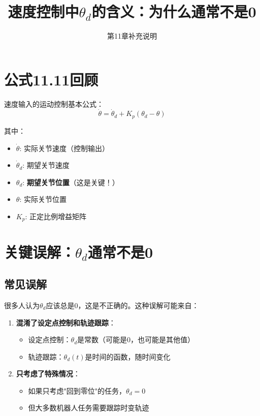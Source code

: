 \documentclass[12pt,a4paper]{article}
\title{速度控制中$\theta_d$的含义：为什么通常不是0}
\author{第11章补充说明}
\date{}
\begin{document}
\maketitle

\section{公式11.11回顾}

速度输入的运动控制基本公式：
\begin{equation}
\dot{\theta} = \dot{\theta}_d + K_p(\theta_d - \theta) \tag{11.11}
\end{equation}

其中：
\begin{itemize}
\item $\dot{\theta}$: 实际关节速度（控制输出）
\item $\dot{\theta}_d$: 期望关节速度
\item $\theta_d$: \textbf{期望关节位置}（这是关键！）
\item $\theta$: 实际关节位置
\item $K_p$: 正定比例增益矩阵
\end{itemize}

\section{关键误解：$\theta_d$通常不是0}

\subsection{常见误解}

很多人认为$\theta_d$应该总是0，这是不正确的。这种误解可能来自：

\begin{enumerate}
\item \textbf{混淆了设定点控制和轨迹跟踪}：
\begin{itemize}
\item 设定点控制：$\theta_d$是常数（可能是0，也可能是其他值）
\item 轨迹跟踪：$\theta_d(t)$是时间的函数，随时间变化
\end{itemize}

\item \textbf{只考虑了特殊情况}：
\begin{itemize}
\item 如果只考虑"回到零位"的任务，$\theta_d = 0$
\item 但大多数机器人任务需要跟踪时变轨迹
\end{itemize}
\end{enumerate}
\end{document}
